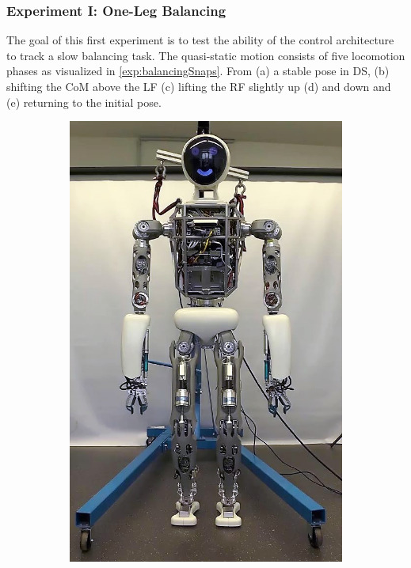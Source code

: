 \subsubsection{Experiment I: One-Leg Balancing}
The goal of this first experiment is to test the ability of the control architecture to track a slow balancing task. The quasi-static motion consists of five locomotion phases as visualized in \cref{exp:balancingSnaps}. From (a) a stable pose in \gls{DS}, (b) shifting the \gls{CoM} above the \gls{LF} (c) lifting the \gls{RF} slightly up (d) and down and (e) returning to the initial pose.
\begin{figure}[h!]
\begin{subfigure}{.2\textwidth}
	\includegraphics[width=.95\linewidth]{experiments/balancing/snaps/1}

\end{subfigure}
\end{figure}
